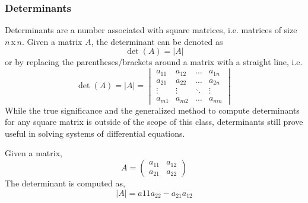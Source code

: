 \documentclass[diffeq.tex]{subfiles}
\begin{document}
    \subsubsection{Determinants}
    \begin{definition}
        Determinants are a number associated with square matrices, i.e. matrices of size $n$\,x\,$n$. Given a matrix $A$, the determinant can be denoted as
        \begin{equation}
            \det(A) = |A|
        \end{equation}
        or by replacing the parentheses/brackets around a matrix with a straight line, i.e.
        \begin{equation}
            \det(A) = |A| = \begin{vmatrix}
                a_{11} & a_{12} & \dots & a_{1n}\\
                a_{21} & a_{22} & \dots & a_{2n}\\
                \vdots & \vdots & \ddots & \vdots\\
                a_{m1} & a_{m2} & \dots & a_{mn}
            \end{vmatrix}
        \end{equation}
        While the true significance and the generalized method to compute determinants for any square matrix is outside of the scope of this class, determinants still prove useful in solving systems of differential equations.
    \end{definition}
    \begin{example}
        Given a matrix,
        \begin{equation}
            A = \begin{pmatrix}
                a_{11} & a_{12}\\
                a_{21} & a_{22}
            \end{pmatrix}
        \end{equation}
        The determinant is computed as,
        \begin{equation}
            |A| = a{11}a_{22} - a_{21}a_{12}
        \end{equation}
    \end{example}
\end{document}

